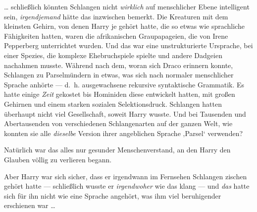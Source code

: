 … schließlich könnten Schlangen nicht \emph{wirklich} auf menschlicher Ebene intelligent sein, \emph{irgendjemand} hätte das inzwischen bemerkt. Die Kreaturen mit dem kleinsten Gehirn, von denen Harry je gehört hatte, die so etwas wie sprachliche Fähigkeiten hatten, waren die afrikanischen Graupapageien, die von Irene Pepperberg unterrichtet wurden. Und das war eine unstrukturierte Ursprache, bei einer Spezies, die komplexe Ehebruchspiele spielte und andere Dadgeien nachahmen musste. Während nach dem, woran sich Draco erinnern konnte, Schlangen zu Parselmündern in etwas, was sich nach normaler menschlicher Sprache anhörte — d.~h. ausgewachsene rekursive syntaktische Grammatik. Es hatte einige \emph{Zeit} gekostet bis Hominiden diese entwickelt hatten, mit großen Gehirnen und einem starken sozialen Selektionsdruck. Schlangen hatten überhaupt nicht viel Gesellschaft, soweit Harry wusste. Und bei Tausenden und Abertausenden von verschiedenen Schlangenarten auf der ganzen Welt, wie konnten sie alle \emph{dieselbe} Version ihrer angeblichen Sprache ‚Parsel‘ verwenden?

Natürlich war das alles nur gesunder Menschenverstand, an den Harry den Glauben völlig zu verlieren begann.

Aber Harry war sich sicher, dass er irgendwann im Fernsehen Schlangen zischen gehört hatte — schließlich wusste er \emph{irgendwoher} wie das klang — und \emph{das} hatte sich für ihn nicht wie eine Sprache angehört, was ihm viel beruhigender erschienen war …

